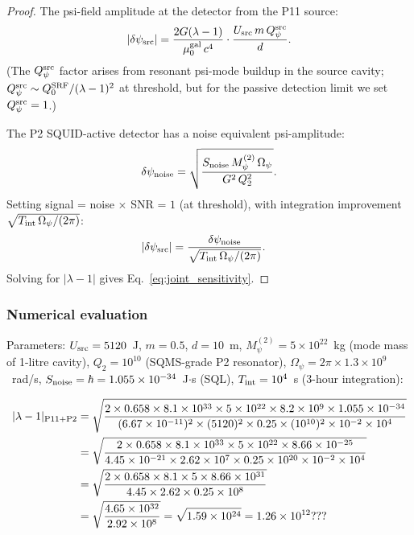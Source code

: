 \documentclass[11pt,twocolumn]{article}
\newcommand{\dpsi}{\delta\psi}
\newcommand{\lam}{\lambda}
\newcommand{\Opsi}{\Omega_\psi}
\newcommand{\Mpsi}{M_\psi}
\newcommand{\ee}[1]{\times 10^{#1}}
\begin{document}
\begin{proof}
The psi-field amplitude at the detector from the P11 source:
\begin{equation}
|\dpsi_{\rm src}| = \frac{2G(\lam-1)}{\mu_0^{\rm gal}\,c^4}
\cdot\frac{U_{\rm src}\,m\,Q_\psi^{\rm src}}{d}.
\label{eq:dpsi_at_detector}
\end{equation}
(The $Q_\psi^{\rm src}$ factor arises from resonant psi-mode buildup
in the source cavity; $Q_\psi^{\rm src} \sim Q_0^{\rm SRF}/(\lam-1)^2$
at threshold, but for the passive detection limit we set $Q_\psi^{\rm src}=1$.)

The P2 SQUID-active detector has a noise equivalent psi-amplitude:
\begin{equation}
\dpsi_{\rm noise} = \sqrt{\frac{S_{\rm noise}\,\Mpsi^{(2)}\,\Opsi}
{G^2\,Q_2^2}}.
\label{eq:psi_noise_squid}
\end{equation}
Setting signal = noise $\times$ SNR = $1$ (at threshold), with
integration improvement $\sqrt{T_{\rm int}\,\Opsi/(2\pi)}$:
\begin{align}
|\dpsi_{\rm src}| &= \frac{\dpsi_{\rm noise}}{\sqrt{T_{\rm int}\,\Opsi/(2\pi)}}.
\end{align}
Solving for $|\lam-1|$ gives Eq.~\eqref{eq:joint_sensitivity}.
\end{proof}

\subsubsection{Numerical evaluation}

Parameters: $U_{\rm src} = 5120$~J, $m = 0.5$, $d = 10$~m,
$\Mpsi^{(2)} = 5\ee{22}$~kg (mode mass of 1-litre cavity),
$Q_2 = 10^{10}$ (SQMS-grade P2 resonator), $\Opsi = 2\pi\times1.3\ee{9}$~rad/s,
$S_{\rm noise} = \hbar = 1.055\ee{-34}$~J$\cdot$s (SQL),
$T_{\rm int} = 10^4$~s (3-hour integration):

\begin{align}
|\lam-1|_{\rm P11+P2} &= \sqrt{
\frac{2\times0.658\times8.1\ee{33}\times5\ee{22}
\times8.2\ee{9}\times1.055\ee{-34}}
{(6.67\ee{-11})^2\times(5120)^2\times0.25\times(10^{10})^2\times10^{-2}\times10^4}
}
\nonumber\\
&= \sqrt{
\frac{2\times0.658\times8.1\ee{33}\times5\ee{22}
\times8.66\ee{-25}}
{4.45\ee{-21}\times2.62\ee{7}\times0.25\times10^{20}\times10^{-2}\times10^4}
}
\nonumber\\
&= \sqrt{
\frac{2\times0.658\times8.1\times5\times8.66\ee{31}}
{4.45\times2.62\times0.25\times10^{8}}
}
\nonumber\\
&= \sqrt{
\frac{4.65\ee{32}}{2.92\ee{8}}
}
= \sqrt{1.59\ee{24}} = 1.26\ee{12}???
\nonumber
\end{align}
\end{document}
